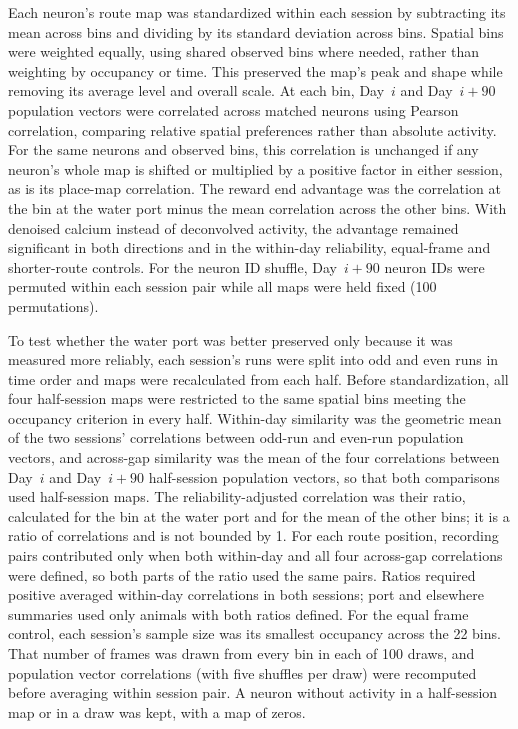 \documentclass[fleqn,10pt]{wlscirep}
\begin{document}
Each neuron's route map was standardized within each session by subtracting its mean across bins and dividing by its standard deviation across bins. Spatial bins were weighted equally, using shared observed bins where needed, rather than weighting by occupancy or time. This preserved the map's peak and shape while removing its average level and overall scale. At each bin, Day~$i$ and Day~$i+90$ population vectors were correlated across matched neurons using Pearson correlation, comparing relative spatial preferences rather than absolute activity. For the same neurons and observed bins, this correlation is unchanged if any neuron's whole map is shifted or multiplied by a positive factor in either session, as is its place-map correlation. The reward end advantage was the correlation at the bin at the water port minus the mean correlation across the other bins. With denoised calcium instead of deconvolved activity, the advantage remained significant in both directions and in the within-day reliability, equal-frame and shorter-route controls. For the neuron ID shuffle, Day~$i+90$ neuron IDs were permuted within each session pair while all maps were held fixed (100 permutations).

To test whether the water port was better preserved only because it was measured more reliably, each session's runs were split into odd and even runs in time order and maps were recalculated from each half. Before standardization, all four half-session maps were restricted to the same spatial bins meeting the occupancy criterion in every half. Within-day similarity was the geometric mean of the two sessions' correlations between odd-run and even-run population vectors, and across-gap similarity was the mean of the four correlations between Day~$i$ and Day~$i+90$ half-session population vectors, so that both comparisons used half-session maps. The reliability-adjusted correlation was their ratio, calculated for the bin at the water port and for the mean of the other bins; it is a ratio of correlations and is not bounded by 1. For each route position, recording pairs contributed only when both within-day and all four across-gap correlations were defined, so both parts of the ratio used the same pairs. Ratios required positive averaged within-day correlations in both sessions; port and elsewhere summaries used only animals with both ratios defined. For the equal frame control, each session's sample size was its smallest occupancy across the 22 bins. That number of frames was drawn from every bin in each of 100 draws, and population vector correlations (with five shuffles per draw) were recomputed before averaging within session pair. A neuron without activity in a half-session map or in a draw was kept, with a map of zeros.
\end{document}
